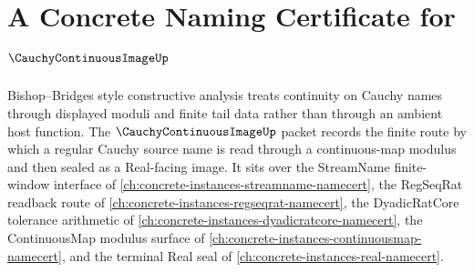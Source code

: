 \chapter{A Concrete Naming Certificate for $\CauchyContinuousImageUp$}
\label{ch:concrete-instances-cauchy-continuous-image-namecert}

Bishop--Bridges style constructive analysis treats continuity on Cauchy names through displayed moduli and finite tail data rather than through an ambient host function. The $\CauchyContinuousImageUp$ packet records the finite route by which a regular Cauchy source name is read through a continuous-map modulus and then sealed as a Real-facing image. It sits over the StreamName finite-window interface of \autoref{ch:concrete-instances-streamname-namecert}, the RegSeqRat readback route of \autoref{ch:concrete-instances-regseqrat-namecert}, the DyadicRatCore tolerance arithmetic of \autoref{ch:concrete-instances-dyadicratcore-namecert}, the ContinuousMap modulus surface of \autoref{ch:concrete-instances-continuousmap-namecert}, and the terminal Real seal of \autoref{ch:concrete-instances-real-namecert}.

